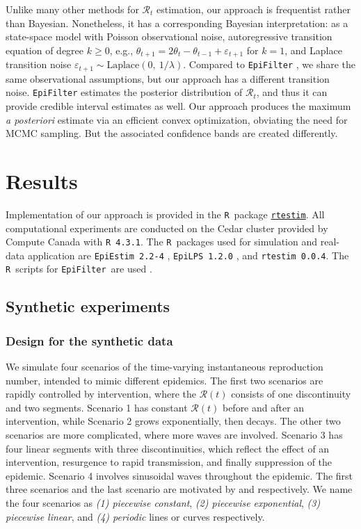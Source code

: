 \documentclass[10pt,letterpaper]{article}
\newcommand{\R}{\texttt{R}}
\def\EpiFilter{\texttt{EpiFilter}}
\def\calR{\mathcal{R}}
\begin{document}
Unlike many other methods for $\calR_t$ estimation, our approach is frequentist
rather than Bayesian. Nonetheless, it has a corresponding Bayesian
interpretation: as a state-space model with Poisson observational noise,
autoregressive transition equation of degree $k\geq 0$, e.g., $\theta_{t+1} =
2\theta_t - \theta_{t-1} + \varepsilon_{t+1}$ for $k=1$, and Laplace transition
noise $\varepsilon_{t+1}\sim \mathrm{Laplace}(0,\ 1/\lambda)$. Compared to
\texttt{EpiFilter} \cite{parag2021improved},
 we share the same observational assumptions, but our approach has a
different transition noise. \texttt{EpiFilter} estimates the posterior
distribution of
$\calR_t$, and thus it can provide credible interval estimates as well. Our
approach produces the maximum \emph{a posteriori} estimate via an efficient
convex optimization, obviating the need for MCMC sampling. But the associated
confidence bands are created differently.


\section{Results}

Implementation of our approach is provided in the \R\ package
\href{https://dajmcdon.github.io/rtestim/}{\texttt{rtestim}}. 
All computational experiments are conducted on the Cedar cluster provided 
by Compute Canada with \texttt{R 4.3.1}. The \R\ packages used for
simulation and real-data application are \texttt{EpiEstim 2.2-4} \cite{Cori2022},
\texttt{EpiLPS 1.2.0} \cite{Gressani2021}, and \texttt{rtestim 0.0.4}. 
The \R\ scripts for \EpiFilter\ are used \cite{kpzoo2020}.

\subsection{Synthetic experiments}

\subsubsection{Design for the synthetic data}

We simulate four scenarios of the time-varying instantaneous reproduction number,
intended to mimic different epidemics. The first two scenarios are rapidly 
controlled by intervention, where the $\calR(t)$ consists
of one discontinuity and two segments. Scenario 1 has constant $\calR(t)$ before
and after an intervention, while Scenario 2 grows exponentially, then decays.
The other two scenarios are more complicated, where more waves
are involved. Scenario 3 has four linear segments with three discontinuities,
which reflect the effect of an intervention, resurgence to rapid transmission,
and finally suppression of the epidemic. Scenario 4 involves sinusoidal waves
throughout the epidemic.
The first three scenarios and the last scenario are motivated by
\cite{parag2021improved} and \cite{gressani2022epilps} respectively. 
We name the four scenarios as \textit{(1) piecewise constant}, \textit{(2) 
piecewise exponential}, \textit{(3) piecewise linear}, and \textit{(4) periodic} 
lines or curves respectively. 
\end{document}
